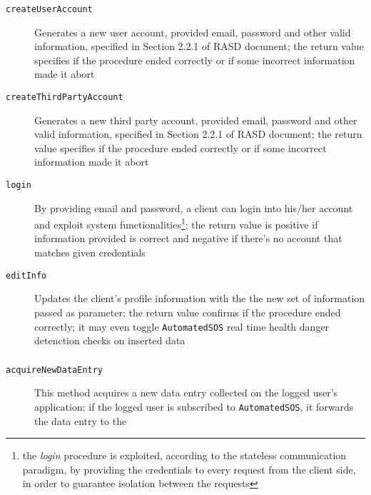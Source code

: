 \documentclass[../DD0.tex]{subfiles}
\begin{document}
    \subsubsection{\AccountManager}

      \begin{description}
        \item[\texttt{createUserAccount}] Generates a new user account, provided email, password and other valid information, specified in Section 2.2.1 of RASD document; the return value specifies if the procedure ended correctly or if some incorrect information made it abort
        \item[\texttt{createThirdPartyAccount}] Generates a new third party account, provided email, password and other valid information, specified in Section 2.2.1 of RASD document; the return value specifies if the procedure ended correctly or if some incorrect information made it abort
        \item[\texttt{login}] By providing email and password, a client can login into his/her account and exploit system functionalities\footnote{the \textit{login} procedure is exploited, according to the stateless communication paradigm, by providing the credentials to every request from the client side, in order to guarantee isolation between the requests}; the return value is positive if information provided is correct and negative if there's no account that matches given credentials
        \item[\texttt{editInfo}] Updates the client's profile information with the the new set of information passed as parameter; the return value confirms if the procedure ended correctly; it may even toggle \texttt{AutomatedSOS} real time health danger detenction checks on inserted data
      \end{description}

    \subsubsection{\DataCollector}
    \label{sec:datacollectormethod}
      \begin{description}
        \item[\texttt{acquireNewDataEntry}] This method acquires a new data entry collected on the logged user's application; if the logged user is subscribed to \texttt{AutomatedSOS}, it forwards the data entry to the \EmergencyDetector
      \end{description}
\end{document}
